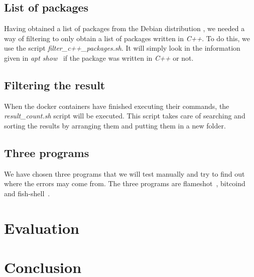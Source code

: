 \documentclass[a4paper,11pt,oneside]{report}
\begin{document}
\section{List of packages}

Having obtained a list of packages from the Debian distribution
\cite{sourcePackage}, we needed a way of filtering to only obtain
a list of packages written in \textit{C++}. To do this, we use the script
\textit{filter\_c++\_packages.sh}. It will simply look in the information given
in \textit{apt show}~\cite{apt} if the package was written in \textit{C++} or
not. 

\section{Filtering the result}
When the docker containers have finished executing their commands, the
\textit{result\_count.sh} script will be executed. This script takes care of searching
and sorting the results by arranging them and putting them in a new folder.

\section{Three programs}
We have chosen three programs that we will test manually and try to find out
where the errors may come from. The three programs are
flameshot~\cite{flameshot}, bitcoind~\cite{bitcoind} and
fish-shell~\cite{fish}.


\chapter{Evaluation}



%



\chapter{Conclusion}
\end{document}
